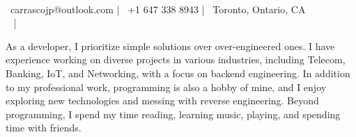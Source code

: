 \documentclass[]{awesome-cv}
\begin{document}
    
\begin{center}
	  \\
	\vspace{2mm}
	{\faEnvelope\ carrascojp@outlook.com} | {\faMobile\ +1 647 338 8943} | {\faMapMarker\ Toronto, Ontario, CA} \\ 
	{\faLinkedinSquare\ \color{darkblue}{https://www.linkedin.com/in/joao-carrasco/}} | {\faGithub\ \color{darkblue}{https://github.com/jpcrs/}} 
\end{center}

\begin{txtx}
As a developer, I prioritize simple solutions over over-engineered ones. I have experience working on diverse projects in various industries, including Telecom, Banking, IoT, and Networking, with a focus on backend engineering. In addition to my professional work, programming is also a hobby of mine, and I enjoy exploring new technologies and messing with reverse engineering. Beyond programming, I spend my time reading, learning music, playing, and spending time with friends.
\end{txtx}
\end{document}
